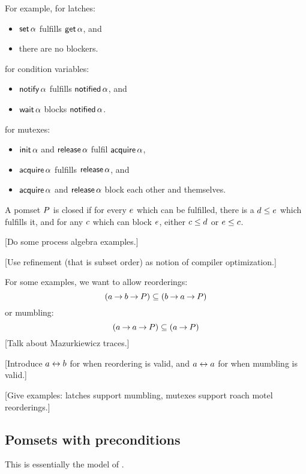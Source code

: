 For example, for latches:
\begin{itemize}
\item $\mathsf{set}\,\alpha{}$ fulfills $\mathsf{get}\,\alpha{}$, and
\item there are no blockers.
\end{itemize}
for condition variables:
\begin{itemize}
\item $\mathsf{notify}\,\alpha{}$ fulfills $\mathsf{notified}\,\alpha{}$, and
\item $\mathsf{wait}\,\alpha{}$ blocks $\mathsf{notified}\,\alpha{}$.
\end{itemize}
for mutexes:
\begin{itemize}
\item $\mathsf{init}\,\alpha$ and $\mathsf{release}\,\alpha$ fulfil $\mathsf{acquire}\,\alpha{}$,
\item $\mathsf{acquire}\,\alpha$ fulfills $\mathsf{release}\,\alpha$, and
\item $\mathsf{acquire}\,\alpha$ and $\mathsf{release}\,\alpha$ block each other and themselves. 
\end{itemize}
  
\begin{definition}
  A pomset $P$ is closed if
  for every $e$ which can be fulfilled,
  there is a $d\le e$ which fulfills it,
  and for any $c$ which can block $e$, either $c\le d$ or $e\le c$. 
\end{definition}

[Do some process algebra examples.]

[Use refinement (that is subset order) as notion of compiler optimization.]

For some examples, we want to allow reorderings:
\[
  (\aAct \wPREFIX \bAct \wPREFIX \aPS)
\subseteq
  (\bAct \wPREFIX \aAct \wPREFIX \aPS)
\]
or mumbling:
\[
  (\aAct \wPREFIX \aAct \wPREFIX \aPS)
\subseteq
  (\aAct \wPREFIX \aPS)
\]
[Talk about Mazurkiewicz traces.]

[Introduce $a\mathrel\leftrightarrow b$ for when reordering is valid,
  and  $a\mathrel\leftrightarrow a$ for when mumbling is valid.]

[Give examples: latches support mumbling, mutexes support roach motel reorderings.]

\subsection{Pomsets with preconditions}

This is essentially the model of \cite{10.1145/3428262}.


